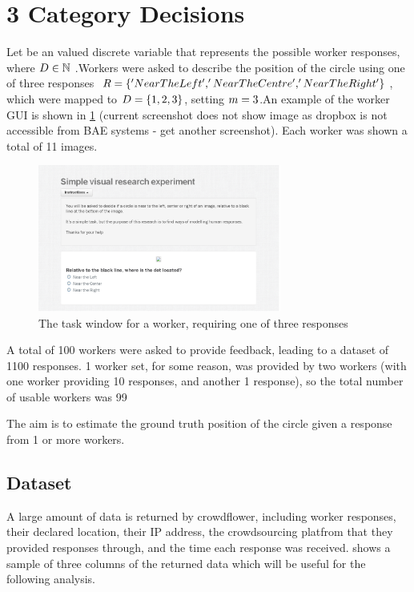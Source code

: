 \section{3 Category Decisions}
Let \possResVec be an \nPossRes valued discrete variable that represents the possible worker responses, where $D \in \mathbb{N}$ .Workers were asked to describe the position of the circle using one of three responses $R = \lbrace 'NearTheLeft', 'NearTheCentre' , 'NearTheRight'\rbrace$, which were mapped to $D=\lbrace 1,2,3 \rbrace$, setting $m=3$.An example of the worker GUI is shown in \ref{Figure:crowdflower_question_3} (current screenshot does not show image as dropbox is not accessible from BAE systems - get another screenshot). Each worker was shown a total of  11 images. 

\begin{figure}
  \centering
  \includegraphics[width=8cm]{crowdflower_gui_noimage.png}
  \caption{The task window for a worker, requiring one of three responses}
  \label{Figure:crowdflower_question_3}
\end{figure}

A total of 100 workers were asked to provide feedback, leading to a dataset of 1100 responses. 1 worker set, for some reason, was provided by two workers (with one worker providing 10 responses, and another 1 response), so the total number of usable workers was 99

The aim is to estimate the ground truth position of the circle given a response from 1 or more workers. 

\subsection{Dataset}

A large amount of data is returned by crowdflower, including worker responses, their declared location, their IP address, the crowdsourcing platfrom that they provided responses through, and the time each response was received.  shows a sample of three columns of the returned data which will be useful for the following analysis.


